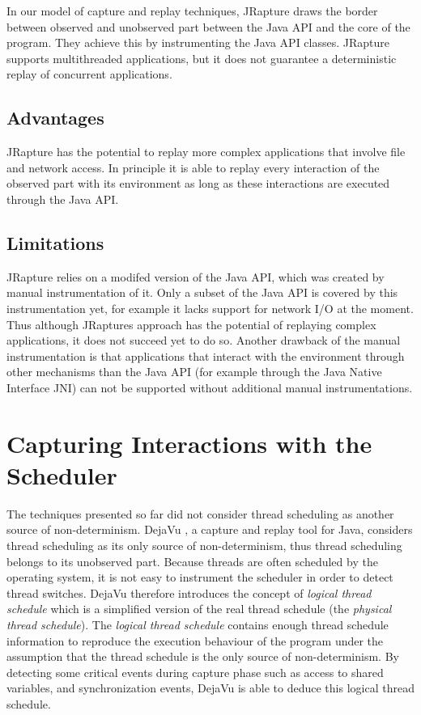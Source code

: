 In our model of capture and replay techniques, JRapture draws the border between observed and unobserved part between the Java API and the core of the program. They achieve this by instrumenting the Java API classes. JRapture supports multithreaded applications, but it does not guarantee a deterministic replay of concurrent applications.

\subsection{Advantages}
JRapture has the potential to replay more complex applications that involve file and network access. In principle it is able to replay every interaction of the observed part with its environment as long as these interactions are executed through the Java API.
\subsection{Limitations}
JRapture relies on a modifed version of the Java API, which was created by manual instrumentation of it. Only a subset of the Java API is covered by this instrumentation yet, for example it lacks support for network I/O at the moment. Thus although JRaptures approach has the potential of replaying complex applications, it does not succeed yet to do so. Another drawback of the manual instrumentation is that applications that interact with the environment through other mechanisms than the Java API (for example through the Java Native Interface JNI) can not be supported without additional manual instrumentations.
\section {Capturing Interactions with the Scheduler}
The techniques presented so far did not consider thread scheduling as another source of non-determinism. DejaVu \cite{dejavu}, a capture and replay tool for Java, considers thread scheduling as its only source of non-determinism, thus thread scheduling belongs to its unobserved part. Because threads are often scheduled by the operating system, it is not easy to instrument the scheduler in order to detect thread switches. DejaVu therefore introduces the concept of \emph{logical thread schedule} which is a simplified version of the real thread schedule (the \emph{physical thread schedule}). The \emph{logical thread schedule} contains enough thread schedule information to reproduce the execution behaviour of the program under the assumption that the thread schedule is the only source of non-determinism. By detecting some critical events during capture phase such as access to shared variables, and synchronization events, DejaVu is able to deduce this logical thread schedule.

